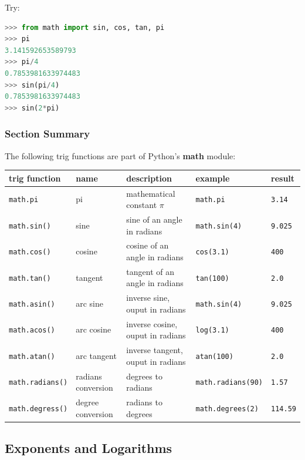 \documentclass{book}
\begin{document}
Try:

\begin{lstlisting}[language=Python]
>>> from math import sin, cos, tan, pi
>>> pi
3.141592653589793
>>> pi/4
0.7853981633974483
>>> sin(pi/4)
0.7853981633974483
>>> sin(2*pi)
\end{lstlisting}
    




    
        \subsubsection{Section Summary}\label{section-summary}

The following trig functions are part of Python's \textbf{math} module:

\begin{longtable}[]{@{}lllll@{}}
\toprule
trig function & name & description & example & result\tabularnewline
\midrule
\endhead
\lstinline!math.pi! & pi & mathematical constant \(\pi\) &
\lstinline!math.pi! & \lstinline!3.14!\tabularnewline
\lstinline!math.sin()! & sine & sine of an angle in radians &
\lstinline!math.sin(4)! & \lstinline!9.025!\tabularnewline
\lstinline!math.cos()! & cosine & cosine of an angle in radians &
\lstinline!cos(3.1)! & \lstinline!400!\tabularnewline
\lstinline!math.tan()! & tangent & tangent of an angle in radians &
\lstinline!tan(100)! & \lstinline!2.0!\tabularnewline
\lstinline!math.asin()! & arc sine & inverse sine, ouput in radians &
\lstinline!math.sin(4)! & \lstinline!9.025!\tabularnewline
\lstinline!math.acos()! & arc cosine & inverse cosine, ouput in radians
& \lstinline!log(3.1)! & \lstinline!400!\tabularnewline
\lstinline!math.atan()! & arc tangent & inverse tangent, ouput in
radians & \lstinline!atan(100)! & \lstinline!2.0!\tabularnewline
\lstinline!math.radians()! & radians conversion & degrees to radians &
\lstinline!math.radians(90)! & \lstinline!1.57!\tabularnewline
\lstinline!math.degress()! & degree conversion & radians to degrees &
\lstinline!math.degrees(2)! & \lstinline!114.59!\tabularnewline
\bottomrule
\end{longtable}
    




    
        \subsection{Exponents and Logarithms}\label{exponents-and-logarithms}
\end{document}
